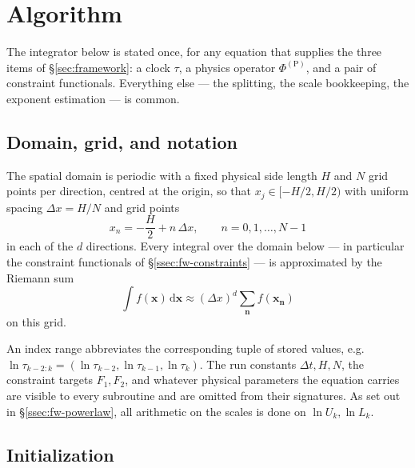 \section{Algorithm}\label{sec:algorithm}

The integrator below is stated once, for any equation that supplies the three
items of \S\ref{sec:framework}: a clock $\tau$, a physics operator
$\Phi^{(\mathrm{P})}$, and a pair of constraint functionals. Everything else
--- the splitting, the scale bookkeeping, the exponent estimation --- is
common.

\subsection{Domain, grid, and notation}\label{ssec:alg-domain}

The spatial domain is periodic with a fixed physical side length $H$ and $N$
grid points per direction, centred at the origin, so that
$x_j \in [-H/2, H/2)$ with uniform spacing $\Delta x = H/N$ and grid points
\begin{equation}\label{eq:alg-grid}
  x_n = -\frac{H}{2} + n\, \Delta x, \qquad n = 0, 1, \dots, N-1
\end{equation}
in each of the $d$ directions. Every integral over the domain below --- in
particular the constraint functionals of \S\ref{ssec:fw-constraints} --- is
approximated by the Riemann sum
\begin{equation}\label{eq:alg-riemann}
  \int f(\mathbf{x})\,\mathrm{d}\mathbf{x} \approx (\Delta x)^d \sum_{\mathbf{n}} f(\mathbf{x_n})
\end{equation}
on this grid.

An index range abbreviates the corresponding tuple of stored values, e.g.\
$\ln \tau_{k-2:k} = (\ln \tau_{k-2}, \ln \tau_{k-1}, \ln \tau_k)$. The run
constants $\Delta t, H, N$, the constraint targets $F_1, F_2$, and whatever
physical parameters the equation carries are visible to every subroutine and
are omitted from their signatures. As set out in \S\ref{ssec:fw-powerlaw}, all
arithmetic on the scales is done on $\ln U_k, \ln L_k$.

\subsection{Initialization}\label{ssec:alg-init}


